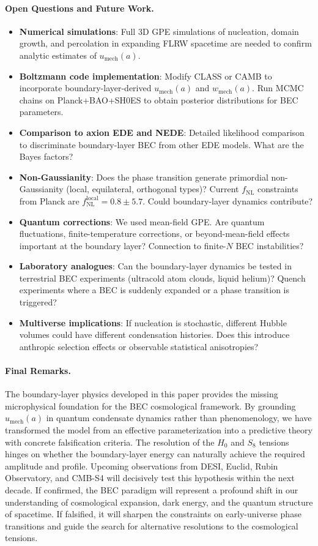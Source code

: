 \documentclass[11pt,a4paper]{article}
\newcommand{\umech}{\ensuremath{u_{\mathrm{mech}}}}
\newcommand{\wmech}{\ensuremath{w_{\mathrm{mech}}}}
\theoremstyle{definition}
\theoremstyle{remark}
\begin{document}
\paragraph{Open Questions and Future Work.}
\begin{itemize}[leftmargin=*, itemsep=0.3em]
\item \textbf{Numerical simulations}: Full 3D GPE simulations of nucleation, domain growth, and percolation in expanding FLRW spacetime are needed to confirm analytic estimates of $\umech(a)$.
\item \textbf{Boltzmann code implementation}: Modify CLASS or CAMB to incorporate boundary-layer-derived $\umech(a)$ and $\wmech(a)$. Run MCMC chains on Planck+BAO+SH0ES to obtain posterior distributions for BEC parameters.
\item \textbf{Comparison to axion EDE and NEDE}: Detailed likelihood comparison to discriminate boundary-layer BEC from other EDE models. What are the Bayes factors?
\item \textbf{Non-Gaussianity}: Does the phase transition generate primordial non-Gaussianity (local, equilateral, orthogonal types)? Current $f_{\mathrm{NL}}$ constraints from Planck are $f_{\mathrm{NL}}^{\mathrm{local}} = 0.8 \pm 5.7$. Could boundary-layer dynamics contribute?
\item \textbf{Quantum corrections}: We used mean-field GPE. Are quantum fluctuations, finite-temperature corrections, or beyond-mean-field effects important at the boundary layer? Connection to finite-$N$ BEC instabilities?
\item \textbf{Laboratory analogues}: Can the boundary-layer dynamics be tested in terrestrial BEC experiments (ultracold atom clouds, liquid helium)? Quench experiments where a BEC is suddenly expanded or a phase transition is triggered?
\item \textbf{Multiverse implications}: If nucleation is stochastic, different Hubble volumes could have different condensation histories. Does this introduce anthropic selection effects or observable statistical anisotropies?
\end{itemize}

\paragraph{Final Remarks.}
The boundary-layer physics developed in this paper provides the missing microphysical foundation for the BEC cosmological framework. By grounding $\umech(a)$ in quantum condensate dynamics rather than phenomenology, we have transformed the model from an effective parameterization into a predictive theory with concrete falsification criteria. The resolution of the $H_0$ and $S_8$ tensions hinges on whether the boundary-layer energy can naturally achieve the required amplitude and profile. Upcoming observations from DESI, Euclid, Rubin Observatory, and CMB-S4 will decisively test this hypothesis within the next decade. If confirmed, the BEC paradigm will represent a profound shift in our understanding of cosmological expansion, dark energy, and the quantum structure of spacetime. If falsified, it will sharpen the constraints on early-universe phase transitions and guide the search for alternative resolutions to the cosmological tensions.
\end{document}
